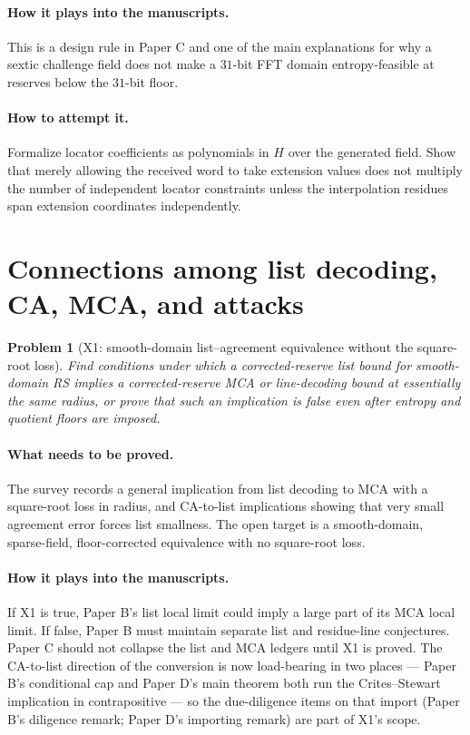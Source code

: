 \documentclass[11pt]{article}
\newtheorem{problem}[theorem]{Problem}
\theoremstyle{definition}
\theoremstyle{remark}
\newcommand{\paperB}{Paper B}
\newcommand{\paperC}{Paper C}
\newcommand{\paperD}{Paper D}
\begin{document}
\paragraph{How it plays into the manuscripts.}  This is a design rule in \paperC{} and one of the main explanations for why a sextic challenge field does not make a $31$-bit FFT domain entropy-feasible at reserves below the $31$-bit floor.

\paragraph{How to attempt it.}  Formalize locator coefficients as polynomials in $H$ over the generated field.  Show that merely allowing the received word to take extension values does not multiply the number of independent locator constraints unless the interpolation residues span extension coordinates independently.

\section{Connections among list decoding, CA, MCA, and attacks}
\label{sec:connections}

\begin{problem}[X1: smooth-domain list--agreement equivalence without the square-root loss]
\label{prob:X1}
Find conditions under which a corrected-reserve list bound for smooth-domain RS implies a corrected-reserve MCA or line-decoding bound at essentially the same radius, or prove that such an implication is false even after entropy and quotient floors are imposed.
\end{problem}

\paragraph{What needs to be proved.}  The survey records a general implication from list decoding to MCA with a square-root loss in radius, and CA-to-list implications showing that very small agreement error forces list smallness.  The open target is a smooth-domain, sparse-field, floor-corrected equivalence with no square-root loss.

\paragraph{How it plays into the manuscripts.}  If X1 is true, \paperB's list local limit could imply a large part of its MCA local limit.  If false, \paperB{} must maintain separate list and residue-line conjectures.  \paperC{} should not collapse the list and MCA ledgers until X1 is proved.  The CA-to-list direction of the conversion is now load-bearing in two places --- \paperB's conditional cap and \paperD's main theorem both run the Crites--Stewart implication in contrapositive --- so the due-diligence items on that import (\paperB's diligence remark; \paperD's importing remark) are part of X1's scope.
\end{document}
